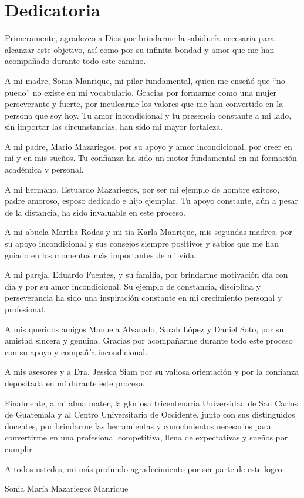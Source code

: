 \chapter*{Dedicatoria}
Primeramente, agradezco a Dios por brindarme la sabiduría necesaria para
alcanzar este objetivo, así como por su infinita bondad y amor que me han
acompañado durante todo este camino.

A mi madre, Sonia Manrique, mi pilar fundamental, quien me enseñó que ``no
puedo'' no existe en mi vocabulario. Gracias por formarme como una mujer
perseverante y fuerte, por inculcarme los valores que me han convertido en la 
persona que soy hoy. Tu amor incondicional y tu presencia constante a mi lado, 
sin importar las circunstancias, han sido mi mayor fortaleza.

A mi padre, Mario Mazariegos, por su apoyo y amor incondicional, por creer en 
mí y en mis sueños. Tu confianza ha sido un motor fundamental en mi formación 
académica y personal.

A mi hermano, Estuardo Mazariegos, por ser mi ejemplo de hombre exitoso, padre 
amoroso, esposo dedicado e hijo ejemplar. Tu apoyo constante, aún a pesar de 
la distancia, ha sido invaluable en este proceso.

A mi abuela Martha Rodas y mi tía Karla Manrique, mis segundas madres, por su 
apoyo incondicional y sus consejos siempre positivos y sabios que me han 
guiado en los momentos más importantes de mi vida.

A mi pareja, Eduardo Fuentes, y su familia, por brindarme motivación día con 
día y por su amor incondicional. Su ejemplo de constancia, disciplina y 
perseverancia ha sido una inspiración constante en mi crecimiento personal y 
profesional.

A mis queridos amigos Manuela Alvarado, Sarah López y Daniel Soto, por su 
amistad sincera y genuina. Gracias por acompañarme durante todo este proceso 
con su apoyo y compañía incondicional.

A mis asesores y a Dra. Jessica Siam por su valiosa orientación y por la
confianza depositada en mí durante este proceso.

Finalmente, a mi alma mater, la gloriosa tricentenaria Universidad de San 
Carlos de Guatemala y al Centro Universitario de Occidente, junto con sus 
distinguidos docentes, por brindarme las herramientas y conocimientos 
necesarios para convertirme en una profesional competitiva, llena de 
expectativas y sueños por cumplir.

A todos ustedes, mi más profundo agradecimiento por ser parte de este logro.

\vspace{1cm}

\begin{flushright}
Sonia María Mazariegos Manrique
\end{flushright}
